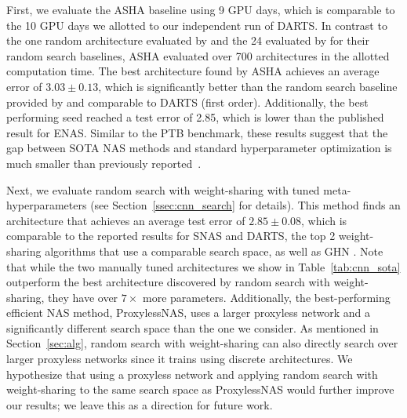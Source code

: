 \documentclass[acmlarge, nonacm]{acmart}
\begin{document}
First, we evaluate the ASHA baseline using 9 GPU days, which is comparable to the 10 GPU days we allotted to our independent run of DARTS. 
In contrast to the one random architecture evaluated by \citet{pham18ENAS} and the 24 evaluated by \citet{liu2018darts} for their random search baselines, ASHA evaluated over 700 architectures in the allotted computation time.
The best architecture found by ASHA achieves an average error of $3.03\pm 0.13$, which is significantly better than the random search baseline provided by \citet{liu2018darts} and comparable to DARTS (first order).  Additionally, the best performing seed reached a test error of 2.85, which is lower than the published result for ENAS.   
Similar to the PTB benchmark, these results suggest that the 
gap between SOTA NAS methods and standard hyperparameter optimization is much smaller than previously reported~\citep{pham18ENAS, liu2018darts}. 

Next, we evaluate random search with weight-sharing with tuned meta-hyperparameters (see Section~\ref{ssec:cnn_search} for details).
This method finds an architecture that achieves an average test error of $2.85\pm 0.08$, which is comparable to the reported results for SNAS and DARTS, the top 2 weight-sharing algorithms that use a comparable search space, as well as GHN \citep{zhang2018graph}.  Note that while the two manually tuned architectures we show in Table~\ref{tab:cnn_sota} outperform the best architecture discovered by random search with weight-sharing, they have over $7\times$ more parameters.  Additionally, the best-performing efficient NAS method, ProxylessNAS, uses a larger proxyless network and a significantly different search space than the one we consider.
As mentioned in Section~\ref{sec:alg}, random search with weight-sharing can also directly search over larger proxyless networks since it trains using discrete architectures. We hypothesize that using a proxyless network and applying random search with weight-sharing to the same search space as ProxylessNAS would further improve our results; we leave this as a direction for future work. 
\end{document}
